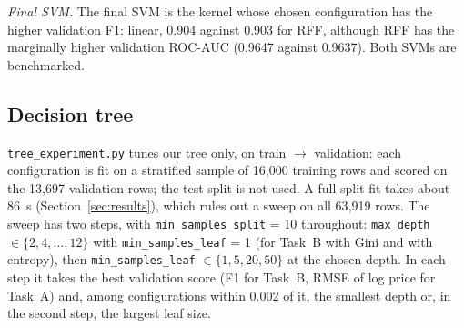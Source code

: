 \documentclass[10pt,twocolumn,a4paper]{article}
\begin{document}
\textit{Final SVM.} The final SVM is the kernel whose chosen configuration
has the higher validation F1: linear, %
0.904 against 0.903 for RFF, %
although RFF has the marginally higher validation ROC-AUC (0.9647 %
against 0.9637). %
Both SVMs are benchmarked.

\subsection{Decision tree}
\texttt{tree\_experiment.py} tunes our tree only, on train $\to$
validation: each configuration is fit on a stratified sample of 16{,}000
training rows %
and scored on the 13{,}697 validation rows; %
the test split is not used. A full-split fit takes about 86~s %
(Section~\ref{sec:results}), which rules out a sweep on all 63{,}919 rows. %
The sweep has two steps, with \texttt{min\_samples\_split} = 10 throughout:
\texttt{max\_depth} $\in \{2, 4, \dots, 12\}$ with
\texttt{min\_samples\_leaf} = 1 (for Task~B with Gini and with entropy),
then \texttt{min\_samples\_leaf} $\in \{1, 5, 20, 50\}$ at the chosen
depth. %
In each step it takes the best validation score (F1 for Task~B, RMSE of
log price for Task~A) and, among configurations within 0.002 of it, the
smallest depth or, in the second step, the largest leaf size. %
\end{document}
